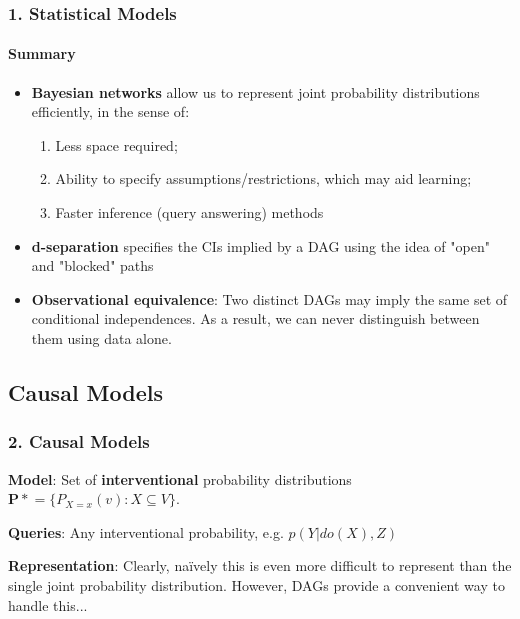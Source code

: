 \documentclass{beamer}
\begin{document}
\begin{frame}
\frametitle{1. Statistical Models}
\framesubtitle{Summary}

\begin{itemize}
	\item \textbf{Bayesian networks} allow us to represent joint probability distributions efficiently, in the sense of:
	\begin{enumerate}
		\item Less space required;
		\item Ability to specify assumptions/restrictions, which may aid learning;
		\item Faster inference (query answering) methods
	\end{enumerate}
	\item \textbf{d-separation} specifies the CIs implied by a DAG using the idea of "open" and "blocked" paths
	\item \textbf{Observational equivalence}: Two distinct DAGs may imply the same set of conditional independences. As a result, we can never distinguish between them using data alone.
\end{itemize}

\end{frame}

\subsection{Causal Models}
\begin{frame}
\frametitle{2. Causal Models}
\textbf{Model}: Set of \textbf{interventional} probability distributions $\pmb{P*} = \{P_{X=x}(v): X \subseteq V\}$.
\bigskip

\textbf{Queries}: Any interventional probability, e.g. $p(Y|do(X), Z)$


\bigskip
\textbf{Representation}: Clearly, na\"ively this is even more difficult to represent than the single joint probability distribution. However, DAGs provide a convenient way to handle this...

\end{frame}
\end{document}
